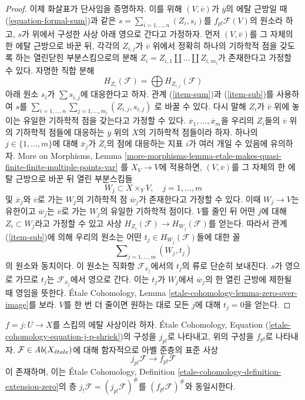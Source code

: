 \begin{proof}
\medskip\noindent
이제 화살표가 단사임을 증명하자. 이를 위해 $(V, \overline{v})$가
$\overline{y}$의 에탈 근방일 때 (\ref{equation-formal-sum})과 같은
$s = \sum_{i = 1, \ldots, n} (Z_i, s_i)$를
$f_{p!}\mathcal{F}(V)$의 원소라 하고, $s$가 위에서 구성한 사상 아래
영으로 간다고 가정하자. 먼저 $(V, \overline{v})$를 그 자체의 한
에탈 근방으로 바꾼 뒤, 각각의 $Z_{i, j}$가 $\overline{v}$ 위에서
정확히 하나의 기하학적 점을 갖도록 하는 열린닫힌 부분스킴으로의 분해
$Z_i = Z_{i, 1} \amalg \ldots \amalg Z_{i, m_i}$가 존재한다고
가정할 수 있다. 자명한 직합 분해
$$
H_{Z_i}(\mathcal{F}) = \bigoplus H_{Z_{i, j}}(\mathcal{F})
$$
아래 원소 $s_i$가 $\sum s_{i, j}$에 대응한다고 하자. 관계
(\ref{item-sum})과 (\ref{item-sub})를 사용하여 $s$를
$\sum_{i = 1, \ldots, n} \sum_{j = 1, \ldots, m_i} (Z_{i, j}, s_{i, j})$
로 바꿀 수 있다. 다시 말해 $Z_i$가 $\overline{v}$ 위에 놓이는
유일한 기하학적 점을 갖는다고 가정할 수 있다.
$\overline{x}_1, \ldots, \overline{x}_m$을 우리의 $Z_i$들의
$\overline{v}$ 위의 기하학적 점들에 대응하는
$\overline{y}$ 위의 $X$의 기하학적 점들이라 하자. 하나의
$j \in \{1, \ldots, m\}$에 대해 $\overline{x}_j$가 $Z_i$의
점에 대응하는 지표 $i$가 여러 개일 수 있음에 유의하자.
More on Morphisms, Lemma
\ref{more-morphisms-lemma-etale-makes-quasi-finite-finite-multiple-points-var}
를 $X_V \to V$에 적용하면, $(V, \overline{v})$를 그 자체의 한 에탈
근방으로 바꾼 뒤 열린 부분스킴들
$$
W_j \subset X \times_Y V,\quad j = 1, \ldots, m
$$
및 $\overline{x}_j$와 $\overline{v}$로 가는 $W_j$의 기하학적 점
$\overline{w}_j$가 존재한다고 가정할 수 있다. 이때 $W_j \to V$는
유한이고 $\overline{w}_j$는 $\overline{v}$로 가는 $W_j$의 유일한
기하학적 점이다. $V$를 줄인 뒤 어떤 $j$에 대해
$Z_i \subset W_j$라고 가정할 수 있고 사상
$H_{Z_i}(\mathcal{F}) \to H_{W_j}(\mathcal{F})$를 얻는다.
따라서 관계 (\ref{item-sub})에 의해 우리의 원소는 어떤
$t_j \in H_{W_j}(\mathcal{F})$들에 대한 꼴
$$
\sum\nolimits_{j = 1, \ldots, m} (W_j, t_j)
$$
의 원소와 동치이다. 이 원소는 직화항
$\mathcal{F}_{\overline{x}_j}$에서의 $t_j$의 류로 단순히 보내진다.
$s$가 영으로 가므로 $t_j$는 $\mathcal{F}_{\overline{x}_j}$에서
영으로 간다. 이는 $t_j$가 $W_j$에서 $\overline{w}_j$의 한 열린
근방에 제한될 때 영임을 뜻한다. \'Etale Cohomology, Lemma
\ref{etale-cohomology-lemma-zero-over-image}를 보라. $V$를 한 번 더
줄이면 원하는 대로 모든 $j$에 대해 $t_j = 0$을 얻는다.
\end{proof}

\begin{lemma}
\label{lemma-finite-support-etale-shriek}
$f = j : U \to X$를 스킴의 에탈 사상이라 하자. \'Etale Cohomology,
Equation (\ref{etale-cohomology-equation-j-p-shriek})의 구성을
$j_{p!}$로 나타내고, 위의 구성을 $f_{p!}$로 나타내자.
$\mathcal{F} \in \textit{Ab}(X_{\acute{e}tale})$에 대해 함자적으로 아벨 준층의
표준 사상
$$
j_{p!}\mathcal{F} \longrightarrow f_{p!}\mathcal{F}
$$
이 존재하며, 이는 \'Etale Cohomology, Definition
\ref{etale-cohomology-definition-extension-zero}의 층
$j_!\mathcal{F} = (j_{p!}\mathcal{F})^\#$를
$(f_{p!}\mathcal{F})^\#$와 동일시한다.
\end{lemma}

